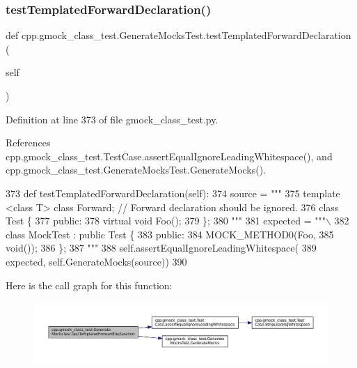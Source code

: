 \subsubsection{\texorpdfstring{test\+Templated\+Forward\+Declaration()}{testTemplatedForwardDeclaration()}}
{\footnotesize\ttfamily def cpp.\+gmock\+\_\+class\+\_\+test.\+Generate\+Mocks\+Test.\+test\+Templated\+Forward\+Declaration (\begin{DoxyParamCaption}\item[{}]{self }\end{DoxyParamCaption})}



Definition at line 373 of file gmock\+\_\+class\+\_\+test.\+py.



References cpp.\+gmock\+\_\+class\+\_\+test.\+Test\+Case.\+assert\+Equal\+Ignore\+Leading\+Whitespace(), and cpp.\+gmock\+\_\+class\+\_\+test.\+Generate\+Mocks\+Test.\+Generate\+Mocks().


\begin{DoxyCode}
373   \textcolor{keyword}{def }testTemplatedForwardDeclaration(self):
374     source = \textcolor{stringliteral}{"""}
375 \textcolor{stringliteral}{template <class T> class Forward;  // Forward declaration should be ignored.}
376 \textcolor{stringliteral}{class Test \{}
377 \textcolor{stringliteral}{ public:}
378 \textcolor{stringliteral}{  virtual void Foo();}
379 \textcolor{stringliteral}{\};}
380 \textcolor{stringliteral}{"""}
381     expected = \textcolor{stringliteral}{"""\(\backslash\)}
382 \textcolor{stringliteral}{class MockTest : public Test \{}
383 \textcolor{stringliteral}{public:}
384 \textcolor{stringliteral}{MOCK\_METHOD0(Foo,}
385 \textcolor{stringliteral}{void());}
386 \textcolor{stringliteral}{\};}
387 \textcolor{stringliteral}{"""}
388     self.assertEqualIgnoreLeadingWhitespace(
389         expected, self.GenerateMocks(source))
390 
\end{DoxyCode}
Here is the call graph for this function\+:
\nopagebreak
\begin{figure}[H]
\begin{center}
\leavevmode
\includegraphics[width=350pt]{classcpp_1_1gmock__class__test_1_1GenerateMocksTest_a18cb0f03ecd4e54d0f787694c1513731_cgraph}
\end{center}
\end{figure}
\mbox{\label{classcpp_1_1gmock__class__test_1_1GenerateMocksTest_a32a2840352d970c631d7be1b6d1970e6}} 
